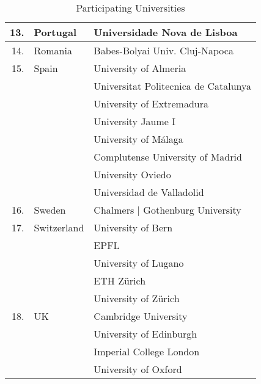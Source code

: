 \documentclass[11pt]{amsart}
\begin{document}
\begin{table}
\begin{center}
\begin{tabular}  {|r|l|l|}
 \hline
13.& Portugal  & Universidade Nova de Lisboa \\
 \hline
14.&Romania  & Babes-Bolyai Univ. Cluj-Napoca \\
\hline
15.&Spain  & University of Almeria \\
&  & Universitat Politecnica de Catalunya \\
&  &  University of Extremadura\\
&  &  University Jaume I\\
&    & University of M\' alaga \\
&  &  Complutense University of Madrid\\
&  &  University Oviedo\\
&  & Universidad de Valladolid \\
\hline
16.& Sweden   &  Chalmers | Gothenburg University\\
\hline
17.&Switzerland   & University of Bern\\
& & EPFL \\
&  &  University of Lugano \\
 &    & ETH Z\" urich \\
&   &  University of Z\" urich\\
\hline
18.&UK   &  Cambridge University\\
&   &  University of Edinburgh\\
 &  & Imperial College London\\
&  & University of Oxford \\
\hline
\end{tabular}
\caption{Participating Universities}
\end{center}
\end{table}


























\end{document}
